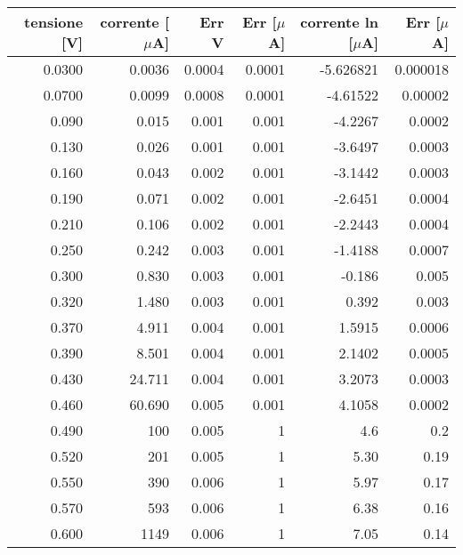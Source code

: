 \begin{tabular}{rrrrrr}
\toprule
tensione [V] & corrente [$\mu$A] & Err V  & Err [$\mu$A] & corrente ln [$\mu$A] & Err [$\mu$A] \\
\midrule
0.0300 & 0.0036 & 0.0004 & 0.0001 & -5.626821 & 0.000018 \\
0.0700 & 0.0099 & 0.0008 & 0.0001 & -4.61522 & 0.00002 \\
0.090 & 0.015 & 0.001 & 0.001 & -4.2267 & 0.0002 \\
0.130 & 0.026 & 0.001 & 0.001 & -3.6497 & 0.0003 \\
0.160 & 0.043 & 0.002 & 0.001 & -3.1442 & 0.0003 \\
0.190 & 0.071 & 0.002 & 0.001 & -2.6451 & 0.0004 \\
0.210 & 0.106 & 0.002 & 0.001 & -2.2443 & 0.0004 \\
0.250 & 0.242 & 0.003 & 0.001 & -1.4188 & 0.0007 \\
0.300 & 0.830 & 0.003 & 0.001 & -0.186 & 0.005 \\
0.320 & 1.480 & 0.003 & 0.001 & 0.392 & 0.003 \\
0.370 & 4.911 & 0.004 & 0.001 & 1.5915 & 0.0006 \\
0.390 & 8.501 & 0.004 & 0.001 & 2.1402 & 0.0005 \\
0.430 & 24.711 & 0.004 & 0.001 & 3.2073 & 0.0003 \\
0.460 & 60.690 & 0.005 & 0.001 & 4.1058 & 0.0002 \\
0.490 & 100 & 0.005 & 1 & 4.6 & 0.2 \\
0.520 & 201 & 0.005 & 1 & 5.30 & 0.19 \\
0.550 & 390 & 0.006 & 1 & 5.97 & 0.17 \\
0.570 & 593 & 0.006 & 1 & 6.38 & 0.16 \\
0.600 & 1149 & 0.006 & 1 & 7.05 & 0.14 \\
\bottomrule
\end{tabular}
